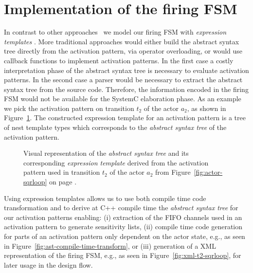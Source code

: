 \section{Implementation of the firing FSM}\label{sec:systemoc-implementation}

In contrast to other approaches~\cite{herrerasystemc:2004, PS:2005, PS:2004} we model our firing FSM with \emph{expression templates} \cite{veldhuizen:1995}.
More traditional approaches would either build the abstract syntax tree directly from the activation pattern, via operator overloading, or would use callback functions to implement activation patterns.
In the first case a costly interpretation phase of the abstract syntax tree is necessary to evaluate activation patterns.
In the second case a parser would be necessary to extract the abstract syntax tree from the source code.
Therefore, the information encoded in the firing FSM would not be available for the SystemC elaboration phase.
As an example we pick the activation pattern on transition $t_2$ of the  actor $a_2$, as shown in Figure~\ref{fig:ast-t2-sqrloop}.
The constructed expression template for an activation pattern is a tree of nest template types which corresponds to the \emph{abstract syntax tree} of the activation pattern.%

\begin{figure}[h]
\centering
\resizebox{\textwidth}{!}{}
%
\caption{\label{fig:ast-t2-sqrloop}%
Visual representation of the \emph{abstract syntax tree} and its corresponding \emph{expression template} derived from the activation pattern used in transition $t_2$ of the  actor $a_2$ from Figure~\ref{fig:actor-sqrloop} on page \pageref{fig:actor-sqrloop}.
}
\end{figure}

Using expression templates allows us to use both compile time code transformation and to derive at C++ compile time the \emph{abstract syntax tree} for our activation patterns enabling:
(i) extraction of the FIFO channels used in an activation pattern to generate sensitivity lists,
(ii) compile time code generation for parts of an activation pattern only dependent on the actor state, e.g., as seen in Figure~\ref{fig:ast-compile-time-transform}, or
(iii) generation of a XML representation of the firing FSM, e.g., as seen in Figure~\ref{fig:xml-t2-sqrloop}, for later usage in the design flow.


